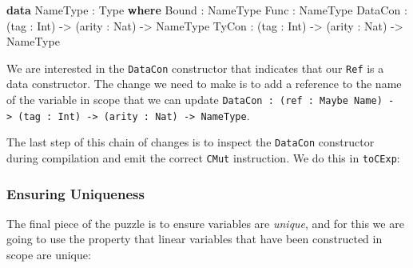 \documentclass[
]{article}
\newenvironment{Shaded}{}{}
\newcommand{\DataTypeTok}[1]{\textcolor[rgb]{0.56,0.13,0.00}{#1}}
\newcommand{\FunctionTok}[1]{\textcolor[rgb]{0.02,0.16,0.49}{#1}}
\newcommand{\KeywordTok}[1]{\textcolor[rgb]{0.00,0.44,0.13}{\textbf{#1}}}
\newcommand{\NormalTok}[1]{#1}
\newcommand{\OperatorTok}[1]{\textcolor[rgb]{0.40,0.40,0.40}{#1}}
\newcommand{\OtherTok}[1]{\textcolor[rgb]{0.00,0.44,0.13}{#1}}
\begin{document}
\begin{Shaded}
\begin{Highlighting}[]
\KeywordTok{data} \DataTypeTok{NameType} \OperatorTok{:} \DataTypeTok{Type} \KeywordTok{where}
     \DataTypeTok{Bound}   \OperatorTok{:} \DataTypeTok{NameType}
     \DataTypeTok{Func}    \OperatorTok{:} \DataTypeTok{NameType}
     \DataTypeTok{DataCon} \OperatorTok{:}\NormalTok{ (tag }\OperatorTok{:} \DataTypeTok{Int}\NormalTok{) }\OtherTok{{-}\textgreater{}}\NormalTok{ (arity }\OperatorTok{:} \DataTypeTok{Nat}\NormalTok{) }\OtherTok{{-}\textgreater{}} \DataTypeTok{NameType}
     \DataTypeTok{TyCon}   \OperatorTok{:}\NormalTok{ (tag }\OperatorTok{:} \DataTypeTok{Int}\NormalTok{) }\OtherTok{{-}\textgreater{}}\NormalTok{ (arity }\OperatorTok{:} \DataTypeTok{Nat}\NormalTok{) }\OtherTok{{-}\textgreater{}} \DataTypeTok{NameType}
\end{Highlighting}
\end{Shaded}

We are interested in the \texttt{DataCon} constructor that indicates
that our \texttt{Ref} is a data constructor. The change we need to make
is to add a reference to the name of the variable in scope that we can
update
\texttt{DataCon\ :\ (ref\ :\ Maybe\ Name)\ -\textgreater{}\ (tag\ :\ Int)\ -\textgreater{}\ (arity\ :\ Nat)\ -\textgreater{}\ NameType}.

The last step of this chain of changes is to inspect the
\texttt{DataCon} constructor during compilation and emit the correct
\texttt{CMut} instruction. We do this in \texttt{toCExp}:

\begin{Shaded}
\end{Shaded}

\hypertarget{ensuring-uniqueness}{%
\subsubsection{Ensuring Uniqueness}\label{ensuring-uniqueness}}

The final piece of the puzzle is to ensure variables are \emph{unique},
and for this we are going to use the property that linear variables that
have been constructed in scope are unique:
\end{document}
